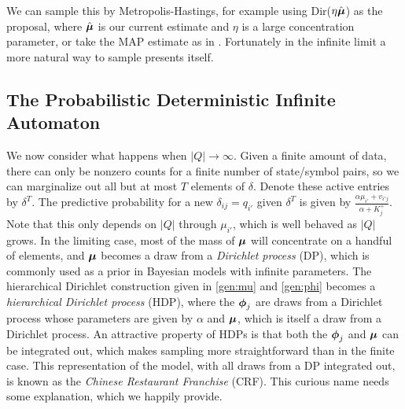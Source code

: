 We can sample this by Metropolis-Hastings, for example using Dir($\eta\hat\bmu$) as the proposal, where $\hat\bmu$ is our current estimate and $\eta$ is a large concentration parameter, or take the MAP estimate as in \cite{Mackay1995}.  Fortunately in the infinite limit a more natural way to sample presents itself.
 
 \subsection{The Probabilistic Deterministic Infinite Automaton}
 
 We now consider what happens when $|Q|\rightarrow\infty$.  Given a finite amount of data, there can only be nonzero counts for a finite number of state/symbol pairs, so we can marginalize out all but at most $T$ elements of $\delta$.  Denote these active entries by $\delta^T$.  The predictive probability for a new $\delta_{ij} = q_{i'}$ given $\delta^T$ is given by $\frac{\alpha\mu_{i'} + v_{i'j}}{\alpha + K^+_j}$.  Note that this only depends on $|Q|$ through $\mu_{i'}$, which is well behaved as $|Q|$ grows.  In the limiting case, most of the mass of $\bmu$ will concentrate on a handful of elements, and $\bmu$ becomes a draw from a {\em Dirichlet process} (DP), which is commonly used as a prior in Bayesian models with infinite parameters.  The hierarchical Dirichlet construction given in \eqref{gen:mu} and \eqref{gen:phi} becomes a {\em hierarchical Dirichlet process} (HDP), where the $\bphi_j$ are draws from a Dirichlet process whose parameters are given by $\alpha$ and $\bmu$, which is itself a draw from a Dirichlet process.  An attractive property of HDPs is that both the $\bphi_j$ and $\bmu$ can be integrated out, which makes sampling more straightforward than in the finite case.  This  representation of the model, with all draws from a DP integrated out, is known as the {\em Chinese Restaurant Franchise} (CRF).  This curious name needs some explanation, which we happily provide.
 

 
 
